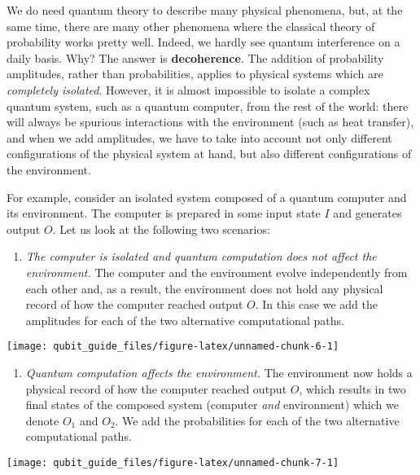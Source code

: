 \documentclass[fleqn]{article}
\providecommand{\tightlist}{%
  \setlength{\itemsep}{0pt}\setlength{\parskip}{0pt}}
\begin{document}
We do need quantum theory to describe many physical phenomena, but, at the same time, there are many other phenomena where the classical theory of probability works pretty well.
Indeed, we hardly see quantum interference on a daily basis.
Why?
The answer is \textbf{decoherence}.
The addition of probability amplitudes, rather than probabilities, applies to physical systems which are \emph{completely isolated}.
However, it is almost impossible to isolate a complex quantum system, such as a quantum computer, from the rest of the world: there will always be spurious interactions with the environment (such as heat transfer), and when we add amplitudes, we have to take into account not only different configurations of the physical system at hand, but also different configurations of the environment.

For example, consider an isolated system composed of a quantum computer and its environment.
The computer is prepared in some input state \(I\) and generates output \(O\).
Let us look at the following two scenarios:

\begin{enumerate}
\def\labelenumi{\arabic{enumi}.}
\tightlist
\item
  \emph{The computer is isolated and quantum computation does not affect the environment.}
  The computer and the environment evolve independently from each other and, as a result, the environment does not hold any physical record of how the computer reached output \(O\).
  In this case we add the amplitudes for each of the two alternative computational paths.
\end{enumerate}

\begin{center}\texttt{[image: qubit\_guide\_files/figure-latex/unnamed-chunk-6-1]} \end{center}

\begin{enumerate}
\def\labelenumi{\arabic{enumi}.}
\setcounter{enumi}{1}
\tightlist
\item
  \emph{Quantum computation affects the environment.}
  The environment now holds a physical record of how the computer reached output \(O\), which results in two final states of the composed system (computer \emph{and} environment) which we denote \(O_1\) and \(O_2\).
  We add the probabilities for each of the two alternative computational paths.
\end{enumerate}

\begin{center}\texttt{[image: qubit\_guide\_files/figure-latex/unnamed-chunk-7-1]} \end{center}
\end{document}
